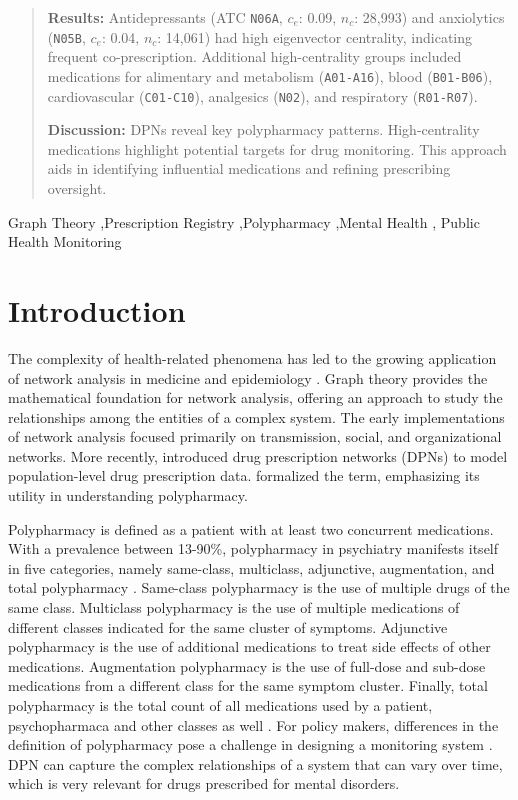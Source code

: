 \documentclass[
  authoryear,
  review]{elsarticle}
\begin{document}
\begin{frontmatter}
\begin{abstract}
\textbf{Results:} Antidepressants (ATC \texttt{N06A}, \(c_e\): 0.09,
\(n_c\): 28,993) and anxiolytics (\texttt{N05B}, \(c_e\): 0.04, \(n_c\):
14,061) had high eigenvector centrality, indicating frequent
co-prescription. Additional high-centrality groups included medications
for alimentary and metabolism (\texttt{A01-A16}), blood
(\texttt{B01-B06}), cardiovascular (\texttt{C01-C10}), analgesics
(\texttt{N02}), and respiratory (\texttt{R01-R07}).

\textbf{Discussion:} DPNs reveal key polypharmacy patterns.
High-centrality medications highlight potential targets for drug
monitoring. This approach aids in identifying influential medications
and refining prescribing oversight.
\end{abstract}





\begin{keyword}
    Graph Theory \sep Prescription
Registry \sep Polypharmacy \sep Mental Health \sep 
    Public Health Monitoring
\end{keyword}
\end{frontmatter}
    

\section{Introduction}\label{introduction}

The complexity of health-related phenomena has led to the growing application of network analysis in medicine and epidemiology \citep{Luke2007,Miglio2021}. Graph theory provides the mathematical foundation for network analysis, offering an approach to study the relationships among the entities of a complex system. The early implementations of network analysis focused primarily on transmission, social, and organizational networks. More recently, \citet{Cavallo2012} introduced drug prescription networks (DPNs) to model population-level drug prescription data. \citet{Bazzoni2015} formalized the term, emphasizing its utility in understanding polypharmacy.


Polypharmacy is defined as a patient with at least two concurrent medications. With a prevalence between 13-90\%, polypharmacy in psychiatry manifests itself in five categories, namely same-class, multiclass, adjunctive, augmentation, and total polypharmacy \citep{Shrivastava2013}. Same-class polypharmacy is the use
of multiple drugs of the same class. Multiclass polypharmacy is
the use of multiple medications of different classes indicated for the
same cluster of symptoms. Adjunctive polypharmacy is the use of additional
medications to treat side effects of other medications. Augmentation
polypharmacy is the use of full-dose and sub-dose medications from a
different class for the same symptom cluster. Finally, total
polypharmacy is the total count of all medications used by a patient, psychopharmaca and other classes as well \citep{Shrivastava2013}. For
policy makers, differences in the definition of polypharmacy pose a challenge in
designing a monitoring system \citep{Sirois2016}. DPN can capture
the complex relationships of a system that can vary over time, which is
very relevant for drugs prescribed for mental disorders.
\end{document}
